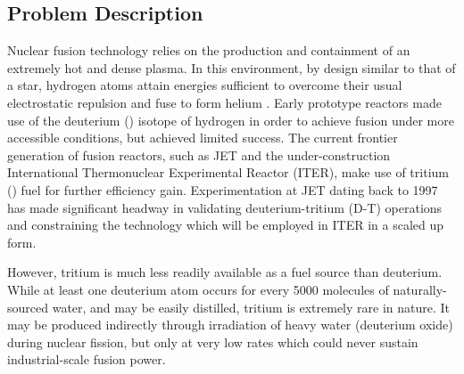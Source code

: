 \subsection{Problem Description}
\label{sec:problemdescription}

Nuclear fusion technology relies on the production and containment of an
extremely hot and dense plasma. In this environment, by design similar to that
of a star, hydrogen atoms attain energies sufficient to overcome their usual
electrostatic repulsion and fuse to form helium \cite{Hernandez2018}. Early prototype reactors
made use of the deuterium () isotope of hydrogen in order to
achieve fusion under more accessible conditions, but achieved limited success.
The current frontier generation of fusion reactors, such as JET and the
under-construction International Thermonuclear Experimental Reactor (ITER), make
use of tritium () fuel for further efficiency gain.
Experimentation at JET dating back to 1997 \cite{Keilhacker1999} has made significant headway in
validating deuterium-tritium (D-T) operations and constraining the technology
which will be employed in ITER in a scaled up form.

However, tritium is much less readily available as a fuel source than deuterium.
While at least one deuterium atom occurs for every 5000 molecules of
naturally-sourced water, and may be easily distilled, tritium is extremely rare
in nature. It may be produced indirectly through irradiation of heavy water
(deuterium oxide) during nuclear fission, but only at very low rates which could
never sustain industrial-scale fusion power.

